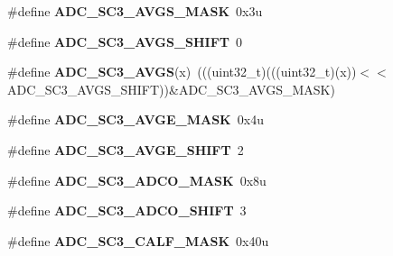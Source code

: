 \begin{DoxyCompactItemize}
\item 
\#define {\bfseries A\+D\+C\+\_\+\+S\+C3\+\_\+\+A\+V\+G\+S\+\_\+\+M\+A\+SK}~0x3u\hypertarget{group__ADC__Register__Masks_ga677b69b096f22ecc80fff1a789d3c48d}{}\label{group__ADC__Register__Masks_ga677b69b096f22ecc80fff1a789d3c48d}

\item 
\#define {\bfseries A\+D\+C\+\_\+\+S\+C3\+\_\+\+A\+V\+G\+S\+\_\+\+S\+H\+I\+FT}~0\hypertarget{group__ADC__Register__Masks_gad00e65ae5553df8fbeef6430a61d2f74}{}\label{group__ADC__Register__Masks_gad00e65ae5553df8fbeef6430a61d2f74}

\item 
\#define {\bfseries A\+D\+C\+\_\+\+S\+C3\+\_\+\+A\+V\+GS}(x)~(((uint32\+\_\+t)(((uint32\+\_\+t)(x))$<$$<$A\+D\+C\+\_\+\+S\+C3\+\_\+\+A\+V\+G\+S\+\_\+\+S\+H\+I\+FT))\&A\+D\+C\+\_\+\+S\+C3\+\_\+\+A\+V\+G\+S\+\_\+\+M\+A\+SK)\hypertarget{group__ADC__Register__Masks_gac693b130e0a9400fe61d0a23f5d59780}{}\label{group__ADC__Register__Masks_gac693b130e0a9400fe61d0a23f5d59780}

\item 
\#define {\bfseries A\+D\+C\+\_\+\+S\+C3\+\_\+\+A\+V\+G\+E\+\_\+\+M\+A\+SK}~0x4u\hypertarget{group__ADC__Register__Masks_gafcb3a8cfe1a126545673ddcf733b74da}{}\label{group__ADC__Register__Masks_gafcb3a8cfe1a126545673ddcf733b74da}

\item 
\#define {\bfseries A\+D\+C\+\_\+\+S\+C3\+\_\+\+A\+V\+G\+E\+\_\+\+S\+H\+I\+FT}~2\hypertarget{group__ADC__Register__Masks_ga56d9621785ea853cf450f1b06d15e1d5}{}\label{group__ADC__Register__Masks_ga56d9621785ea853cf450f1b06d15e1d5}

\item 
\#define {\bfseries A\+D\+C\+\_\+\+S\+C3\+\_\+\+A\+D\+C\+O\+\_\+\+M\+A\+SK}~0x8u\hypertarget{group__ADC__Register__Masks_ga9054cd805b818a928ca4309c717466db}{}\label{group__ADC__Register__Masks_ga9054cd805b818a928ca4309c717466db}

\item 
\#define {\bfseries A\+D\+C\+\_\+\+S\+C3\+\_\+\+A\+D\+C\+O\+\_\+\+S\+H\+I\+FT}~3\hypertarget{group__ADC__Register__Masks_ga8e5f5e3a1378880d2a03d1662f39c308}{}\label{group__ADC__Register__Masks_ga8e5f5e3a1378880d2a03d1662f39c308}

\item 
\#define {\bfseries A\+D\+C\+\_\+\+S\+C3\+\_\+\+C\+A\+L\+F\+\_\+\+M\+A\+SK}~0x40u\hypertarget{group__ADC__Register__Masks_ga3a706436447b6113727826e303c3fbe6}{}\label{group__ADC__Register__Masks_ga3a706436447b6113727826e303c3fbe6}


\end{DoxyCompactItemize}

